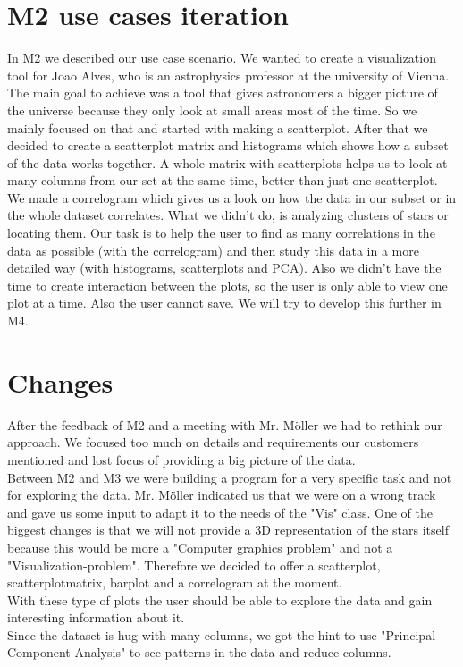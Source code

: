 \documentclass{article}
\begin{document}
\section{M2 use cases iteration}
In M2 we described our use case scenario. We wanted to create a visualization tool for Joao Alves, who is an astrophysics professor at the university of Vienna. The main goal to achieve was a tool that gives astronomers a bigger picture of the universe because they only look at small areas most of the time. So we mainly focused on that and started with making a scatterplot. After that we decided to create a scatterplot matrix and histograms which shows how a subset of the data works together. A whole matrix with scatterplots helps us to look at many columns from our set at the same time, better than just one scatterplot. We made a correlogram which gives us a look on how the data in our subset or in the whole dataset correlates. What we didn't do, is analyzing clusters of stars or locating them. Our task is to help the user to find as many correlations in the data as possible (with the correlogram) and then study this data in a more detailed way (with histograms, scatterplots and PCA). Also we didn't have the time to create interaction between the plots, so the user is only able to view one plot at a time. Also the user cannot save. We will try to develop this further in M4.
\section{Changes}
After the feedback of M2 and a meeting with Mr. Möller we had to rethink our approach. We focused too much on details and requirements our customers mentioned and lost focus of providing a big picture of the data.\\
Between M2 and M3 we were building a program for a very specific task and not for exploring the data. Mr. Möller indicated us that we were on a wrong track and gave us some input to adapt it to the needs of the "Vis" class. One of the biggest changes is that we will not provide a 3D representation of the stars itself because this would be more a "Computer graphics problem" and not a "Visualization-problem". Therefore we decided to offer a scatterplot, scatterplotmatrix, barplot and a correlogram at the moment.\\
With these type of plots the user should be able to explore the data and gain interesting information about it.\\
Since the dataset is hug with many columns, we got the hint to use "Principal Component Analysis" to see patterns in the data and reduce columns.
\end{document}
